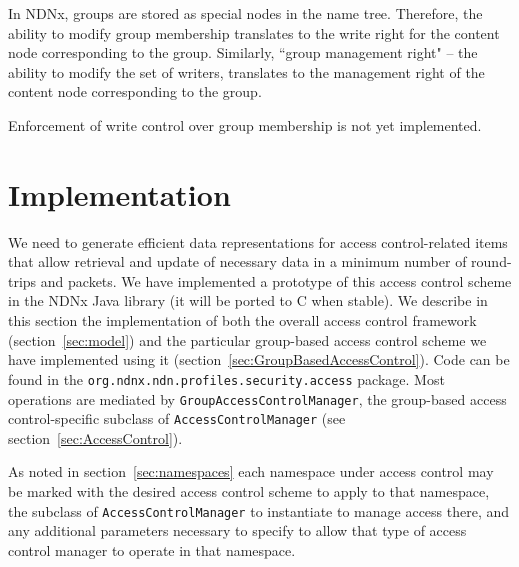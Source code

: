 In NDNx, groups are stored as special nodes in the name
tree. Therefore, the ability to modify group membership translates to
the write right for the content node corresponding to the
group. Similarly, ``group management right" -- the ability to modify
the set of writers, translates to the management right of the content
node corresponding to the group.

Enforcement of write control over group membership is not yet implemented. 

\section{Implementation}
\label{sec:implementation}
We need to generate efficient data representations for access
control-related items that allow retrieval and update of necessary
data in a minimum number of round-trips and packets. We have
implemented a prototype of this access control scheme in the NDNx Java
library (it will be ported to C when stable). We describe in this
section the implementation of both the overall access control
framework (section~\ref{sec:model}) and the particular group-based
access control scheme we have implemented using it
(section~\ref{sec:GroupBasedAccessControl}). Code can be found in the
{\tt org.ndnx.ndn.profiles.security.access} package. Most operations
are mediated by {\tt GroupAccessControlManager}, the group-based
access control-specific subclass of {\tt AccessControlManager} (see
section~\ref{sec:AccessControl}).

As noted in section~\ref{sec:namespaces} each namespace under access
control may be marked with the desired access control scheme to apply
to that namespace, the subclass of {\tt AccessControlManager} to
instantiate to manage access there, and any additional parameters
necessary to specify to allow that type of access control manager to
operate in that namespace.

